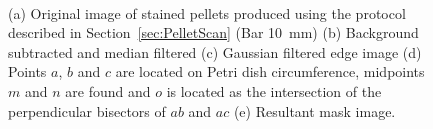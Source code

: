 \begin{figure}[tb]
	\centering
	\hspace{0.3cm}
	\hspace{0.3cm}
	\\
  \hspace{0.3cm}
  \caption{(a) Original image of stained pellets produced using the protocol described in Section~\ref{sec:PelletScan} (Bar 10~mm) (b) Background subtracted and median filtered (c) Gaussian filtered edge image (d) Points $a$, $b$ and $c$ are located on Petri dish circumference, midpoints $m$ and $n$ are found and $o$ is located as the intersection of the perpendicular bisectors of $ab$ and $ac$ (e) Resultant mask image.}
  \label{fig:PelletProc}
\end{figure}

